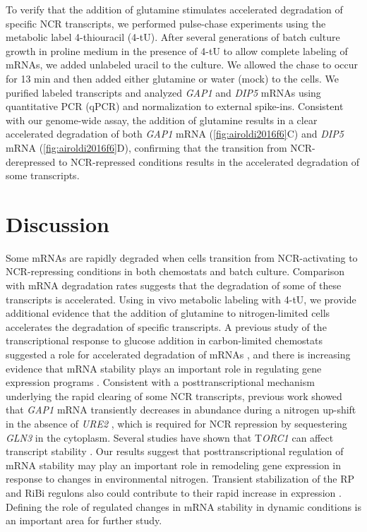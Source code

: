 To verify
that the addition of glutamine stimulates accelerated degradation of
specific NCR transcripts, we performed pulse-chase experiments using
the metabolic label 4-thiouracil (4-tU). After several generations of
batch culture growth in proline medium in the presence of 4-tU to
allow complete labeling of mRNAs, we added unlabeled uracil to the
culture. We allowed the chase to occur for 13 min and then added
either glutamine or water (mock) to the cells. We purified labeled
transcripts and analyzed \textit{GAP1} and \textit{DIP5} 
mRNAs using quantitative PCR
(qPCR) and normalization to external spike-ins. Consistent with our
genome-wide assay, the addition of glutamine results in a clear
accelerated degradation of both \textit{GAP1} mRNA 
(\autoref{fig:airoldi2016f6}C)
and \textit{DIP5} mRNA (\autoref{fig:airoldi2016f6}D), 
confirming that the transition from NCR-derepressed to
NCR-repressed conditions results in the accelerated degradation of
some transcripts.  

\section{Discussion} 

Some mRNAs are rapidly degraded when cells
transition from NCR-activating to NCR-repressing conditions in both
chemostats and batch culture. Comparison with mRNA degradation rates
suggests that the degradation of some of these transcripts is
accelerated. Using in vivo metabolic labeling with 4-tU, we provide
additional evidence that the addition of glutamine to nitrogen-limited
cells accelerates the degradation of specific transcripts. A previous
study of the transcriptional response to glucose addition in
carbon-limited chemostats suggested a role for accelerated degradation
of mRNAs 
\parencite{kresnowati2006transcriptome}
, and there is increasing evidence
that mRNA stability plays an important role in regulating gene
expression programs 
\parencite{puig2005coordinated,bennett2008metabolic,baumgartner2011antagonistic}. 
Consistent with a posttranscriptional
mechanism underlying the rapid clearing of some NCR transcripts,
previous work showed that \textit{GAP1} mRNA transiently decreases in abundance
during a nitrogen up-shift in the absence of \textit{URE2} 
\parencite{ter1998repression}, 
which is required for NCR repression by sequestering \textit{GLN3} in
the cytoplasm. Several studies have shown that T\textit{ORC1} can affect
transcript stability 
\parencite{albig2001target,munchel2011dynamic}.
Our results suggest that posttranscriptional regulation of mRNA
stability may play an important role in remodeling gene expression in
response to changes in environmental nitrogen. Transient stabilization
of the RP and RiBi regulons also could contribute to their rapid
increase in expression 
\parencite{yin2003glucose}. Defining the role of
regulated changes in mRNA stability in dynamic conditions is an
important area for further study. 

